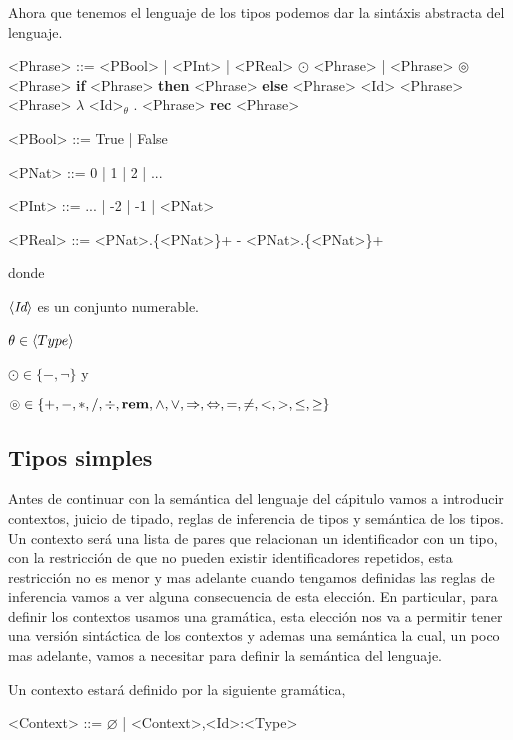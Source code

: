 Ahora que tenemos el lenguaje de los tipos podemos dar la sint\'axis
abstracta del lenguaje.

\setlength{\grammarindent}{6em}
\begin{grammar}

<Phrase> ::= <PBool> | <PInt> | <PReal>
\alt $\odot$ <Phrase> | <Phrase> $\circledcirc$ <Phrase>
\alt \textbf{if} <Phrase> \textbf{then} <Phrase> \textbf{else} <Phrase>
\alt <Id> 
\alt <Phrase> <Phrase>
\alt $\lambda$ <Id>$_\theta$ . <Phrase>
\alt \textbf{rec} <Phrase>

<PBool> ::= True | False

<PNat>  ::= 0 | 1 | 2 | ...

<PInt>  ::= ... | -2 | -1 | <PNat> 

<PReal> ::= <PNat>.\{<PNat>\}+ 
\alt - <PNat>.\{<PNat>\}+

\end{grammar}

\noindent
donde \ 

$\langle \textit{Id} \rangle$ es un conjunto numerable.

$\theta \in \langle Type \rangle$ \

$\odot \in \{-, \neg\}$ y \

$\circledcirc \in \{+,-,*,/,\div,\textbf{rem},\wedge,\vee,\Rightarrow,\Leftrightarrow, =,\neq,<,>,\leq,\geq\}$

\subsection{Tipos simples}

Antes de continuar con la sem\'antica del lenguaje del c\'apitulo
vamos a introducir contextos, juicio de tipado, reglas de inferencia de tipos y
sem\'antica de los tipos.\\

Un contexto ser\'a una lista de pares que relacionan un identificador 
con un tipo, con la restricci\'on de que no pueden
existir identificadores repetidos, esta restricci\'on no es menor y mas
adelante cuando tengamos definidas las reglas de inferencia vamos a
ver alguna consecuencia de esta elecci\'on. En particular, para
definir los contextos usamos una gram\'atica, esta elecci\'on 
nos va a permitir tener una versi\'on sint\'actica de los contextos
y ademas una sem\'antica la cual, un poco mas adelante, vamos a
necesitar para definir la sem\'antica del lenguaje.

\begin{definition}\label{lambdaa:context}

Un contexto estar\'a definido por la siguiente gram\'atica,\

\begin{grammar}

<Context> ::= $\varnothing$ | <Context>,<Id>:<Type>

\end{grammar}

\end{definition}

